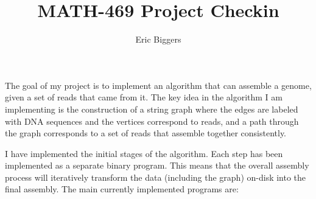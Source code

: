 \documentclass[letterpaper,12pt]{article}
\title{MATH-469 Project Checkin}
\author{Eric Biggers}
\begin{document}
\maketitle

The goal of my project is to implement an algorithm that can assemble a genome,
given a set of reads that came from it.  The key idea in the algorithm I am
implementing is the construction of a string graph where the edges are labeled
with DNA sequences and the vertices correspond to reads, and a path through the
graph corresponds to a set of reads that assemble together consistently.

I have implemented the initial stages of the algorithm.  Each step has been
implemented as a separate binary program.  This means that the overall assembly
process will iteratively transform the data (including the graph) on-disk into
the final assembly.  The main currently implemented programs are:
\end{document}
